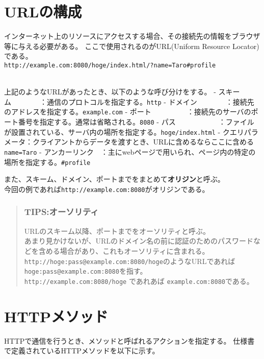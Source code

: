 \section{URLの構成}\label{urlux306eux69cbux6210}

インターネット上のリソースにアクセスする場合、その接続先の情報をブラウザ等に与える必要がある。
ここで使用されるのがURL(Uniform Resource Locator)である。\\
\texttt{http://example.com:8080/hoge/index.html/?name=Taro\#profile}\strut \\
上記のようなURLがあったとき、以下のような呼び分けをする。 -
スキーム　　　　：通信のプロトコルを指定する。\texttt{http} -
ドメイン　　　　：接続先のアドレスを指定する。\texttt{example.com} -
ポート　　　　　：接続先のサーバのポート番号を指定する。通常は省略される。\texttt{8080}
-
パス　　　　　　：ファイルが設置されている、サーバ内の場所を指定する。\texttt{hoge/index.html}
-
クエリパラメータ：クライアントからデータを渡すとき、URLに含めるならここに含める\texttt{name=Taro}
-
アンカーリンク　：主にwebページで用いられ、ページ内の特定の場所を指定する。\texttt{\#profile}

また、スキーム、ドメイン、ポートまでをまとめて\textbf{オリジン}と呼ぶ。\\
今回の例であれば\texttt{http://example.com:8080}がオリジンである。

\begin{quote}
\subsubsection{TIPS:オーソリティ}\label{tipsux30aaux30fcux30bdux30eaux30c6ux30a3}

URLのスキーム以降、ポートまでをオーソリティと呼ぶ。\\
あまり見かけないが、URLのドメイン名の前に認証のためのパスワードなどを含める場合があり、これもオーソリティに含まれる。\\
\texttt{http://hoge:pass@example.com:8080/hoge}のようなURLであれば\texttt{hoge:pass@example.com:8080}を指す。\\
\texttt{http://example.com:8080/hoge} であれあば
\texttt{example.com:8080}である。
\end{quote}

\section{HTTPメソッド}\label{httpux30e1ux30bdux30c3ux30c9}

HTTPで通信を行うとき、メソッドと呼ばれるアクションを指定する。
仕様書で定義されているHTTPメソッドを以下に示す。

